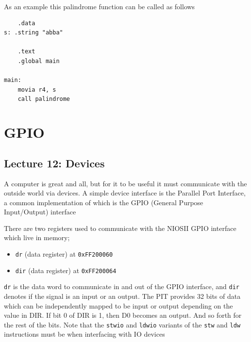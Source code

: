 \documentclass[../notes.tex]{subfiles}
\begin{document}
As an example this palindrome function can be called as follows


\begin{listing}[H]
\begin{verbatim}
	.data
s: .string "abba"

	.text
	.global main

main:
	movia r4, s
	call palindrome
\end{verbatim}
\end{listing}











\section{GPIO}

\subsection{Lecture 12: Devices}


A computer is great and all, but for it to be useful it must communicate with the outside world via devices. A simple device interface is the Parallel Port Interface, a common implementation of which is the GPIO (General Purpose Input/Output) interface

There are two registers used to communicate with the NIOSII GPIO interface which live in memory;

\begin{itemize}
	\item \texttt{dr}  (data register) at \texttt{0xFF200060} 
	\item \texttt{dir}  (data register) at \texttt{0xFF200064} 
\end{itemize}


\texttt{dr} is the data word to communicate in and out of the GPIO interface, and \texttt{dir} denotes if the signal is an input or an output.
The PIT provides 32 bits of data which can be independently mapped to be input or output depending on the value in DIR. If bit 0 of DIR is 1, then D0 becomes an output. And so forth for the rest of the bits.
Note that the \texttt{stwio} and \texttt{ldwio} variants of the \texttt{stw} and \texttt{ldw} instructions must be when interfacing with IO devices
\end{document}
